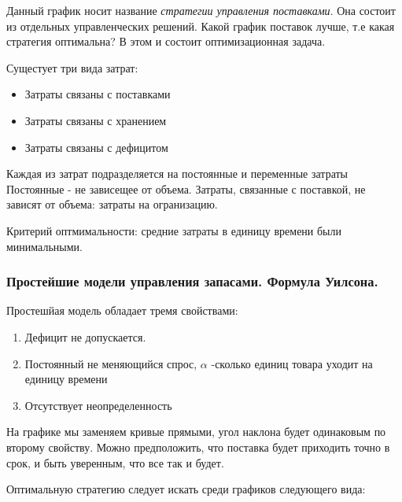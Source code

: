 \documentclass[aps,%
12pt,%
final,%
oneside,
onecolumn,%
musixtex, %
superscriptaddress,%
centertags]{article} %
\theoremstyle{plain}
\begin{document}
Данный график носит название \textit{стратегии управления поставками}. Она состоит из отдельных управленческих решений. Какой график поставок лучше, т.е какая стратегия оптимальна?
В этом и состоит оптимизационная задача.

Сущестует три вида затрат:
\begin{itemize}
	\item Затраты связаны с поставками
	\item Затраты связаны с хранением
	\item Затраты связаны с дефицитом
\end{itemize}

Каждая из затрат подразделяется на постоянные и переменные затраты
Постоянные - не зависещее от объема. Затраты, связанные с поставкой, не зависят от объема: затраты на огранизацию.


Критерий оптмимальности: средние затраты в единицу времени были минимальными.

\subsubsection{Простейшие модели управления запасами. Формула Уилсона.}

Простешйая модель обладает тремя свойствами:

\begin{enumerate}
	\item Дефицит не допускается.
	\item Постоянный не меняющийся спрос, $\alpha$ -сколько единиц товара уходит на единицу времени
	\item Отсутствует неопределенность
\end{enumerate}

На графике мы заменяем кривые прямыми, угол наклона будет одинаковым по второму свойству.
Можно предположить, что поставка будет приходить точно в срок, и быть уверенным, что все так и будет.

Оптимальную стратегию следует искать среди графиков следующего вида:

\begin{center}
\end{center}
\end{document}
